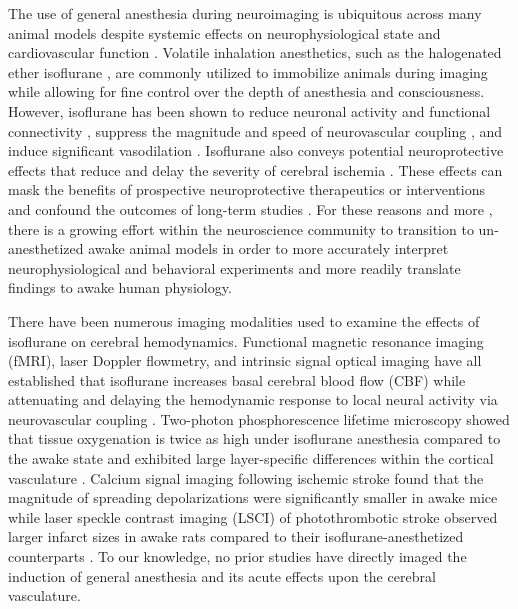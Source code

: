 \documentclass[review]{elsarticle}
\begin{document}
The use of general anesthesia during neuroimaging is ubiquitous across many animal models despite systemic effects on neurophysiological state and cardiovascular function \cite{Slupe:2018ea}. Volatile inhalation anesthetics, such as the halogenated ether isoflurane \cite{Eger:1981ia}, are commonly utilized to immobilize animals during imaging while allowing for fine control over the depth of anesthesia and consciousness. However, isoflurane has been shown to reduce neuronal activity \cite{Aksenov:2015ea} and functional connectivity \cite{Xie:2019de}, suppress the magnitude and speed of neurovascular coupling \cite{Masamoto:2012bj,Takuwa:2012ee,Pisauro:2013cx}, and induce significant vasodilation \cite{Koenig:1994rn,Iida:1998th}. Isoflurane also conveys potential neuroprotective effects that reduce and delay the severity of cerebral ischemia \cite{Kitano:2007ia,Kawaguchi:2000id,Sakai:2007wc,Li:2013ip,Lu:2017bo}. These effects can mask the benefits of prospective neuroprotective therapeutics or interventions and confound the outcomes of long-term studies \cite{Kapinya:2002ua,Seto:2014ga}. For these reasons and more \cite{Gao:2017tw}, there is a growing effort within the neuroscience community to transition to un-anesthetized awake animal models in order to more accurately interpret neurophysiological and behavioral experiments and more readily translate findings to awake human physiology.

There have been numerous imaging modalities used to examine the effects of isoflurane on cerebral hemodynamics. Functional magnetic resonance imaging (fMRI), laser Doppler flowmetry, and intrinsic signal optical imaging have all established that isoflurane increases basal cerebral blood flow (CBF) while attenuating and delaying the hemodynamic response to local neural activity via neurovascular coupling \cite{Desai:2011mb,Aksenov:2015ea,Takuwa:2012ee,Pisauro:2013cx}. Two-photon phosphorescence lifetime microscopy showed that tissue oxygenation is twice as high under isoflurane anesthesia compared to the awake state and exhibited large layer-specific differences within the cortical vasculature \cite{Lyons:2016bd}. Calcium signal imaging following ischemic stroke found that the magnitude of spreading depolarizations were significantly smaller in awake mice \cite{Balbi:2017cj} while laser speckle contrast imaging (LSCI) of photothrombotic stroke observed larger infarct sizes in awake rats compared to their isoflurane-anesthetized counterparts \cite{Lu:2017bo}. To our knowledge, no prior studies have directly imaged the induction of general anesthesia and its acute effects upon the cerebral vasculature.
\end{document}
